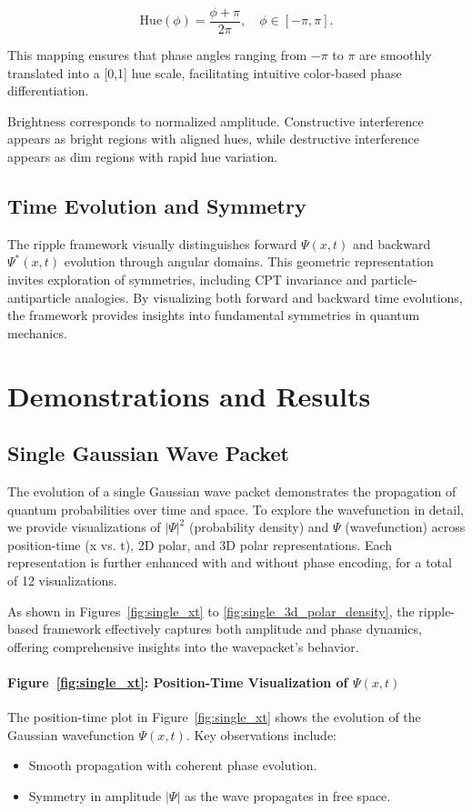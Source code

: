 \documentclass[12pt]{article}
\begin{document}
\[
\text{Hue}(\phi) = \frac{\phi + \pi}{2\pi}, \quad \phi \in [-\pi, \pi].
\]

This mapping ensures that phase angles ranging from \(-\pi\) to \(\pi\) are smoothly translated into a [0,1] hue scale, facilitating intuitive color-based phase differentiation.

Brightness corresponds to normalized amplitude. Constructive interference appears as bright regions with aligned hues, while destructive interference appears as dim regions with rapid hue variation.

\subsection{Time Evolution and Symmetry}
The ripple framework visually distinguishes forward \(\Psi(x,t)\) and backward \(\Psi^*(x,t)\) evolution through angular domains. This geometric representation invites exploration of symmetries, including CPT invariance and particle-antiparticle analogies. By visualizing both forward and backward time evolutions, the framework provides insights into fundamental symmetries in quantum mechanics.

\section{Demonstrations and Results}
\label{sec:demonstrations_results}

\subsection{Single Gaussian Wave Packet}
The evolution of a single Gaussian wave packet demonstrates the propagation of quantum probabilities over time and space. To explore the wavefunction in detail, we provide visualizations of \(|\Psi|^2\) (probability density) and \(\Psi\) (wavefunction) across position-time (x vs. t), 2D polar, and 3D polar representations. Each representation is further enhanced with and without phase encoding, for a total of 12 visualizations.
    
As shown in Figures~\ref{fig:single_xt} to \ref{fig:single_3d_polar_density}, the ripple-based framework effectively captures both amplitude and phase dynamics, offering comprehensive insights into the wavepacket's behavior.

\paragraph{Figure~\ref{fig:single_xt}: Position-Time Visualization of \(\Psi(x,t)\)}
The position-time plot in Figure~\ref{fig:single_xt} shows the evolution of the Gaussian wavefunction \(\Psi(x,t)\). Key observations include:
\begin{itemize}
    \item Smooth propagation with coherent phase evolution.
    \item Symmetry in amplitude \(|\Psi|\) as the wave propagates in free space.
\end{itemize}
\end{document}
